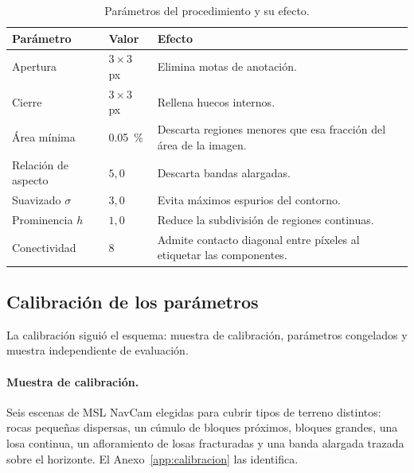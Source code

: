 \begin{table}[htbp]
  \centering
  \caption{Parámetros del procedimiento y su efecto.}
  \label{tab:parametros}
  \begin{tabular}{llp{6.3cm}}
    \toprule
    \textbf{Parámetro} & \textbf{Valor} & \textbf{Efecto} \\
    \midrule
    Apertura            & $3\times3$ px & Elimina motas de anotación. \\
    Cierre              & $3\times3$ px & Rellena huecos internos. \\
    Área mínima         & \SI{0.05}{\percent} & Descarta regiones menores que esa fracción del
      área de la imagen. \\
    Relación de aspecto & $5{,}0$  & Descarta bandas alargadas. \\
    Suavizado $\sigma$  & $3{,}0$  & Evita máximos espurios del contorno. \\
    Prominencia $h$     & $1{,}0$  & Reduce la subdivisión de regiones continuas. \\
    Conectividad        & $8$      & Admite contacto diagonal entre píxeles al etiquetar las
      componentes. \\
    \bottomrule
  \end{tabular}
\end{table}

\subsection{Calibración de los parámetros}
\label{sec:calibracion}

La calibración siguió el esquema: muestra de calibración, parámetros congelados y muestra
independiente de evaluación.

\paragraph{Muestra de calibración.} Seis escenas de MSL NavCam elegidas para cubrir tipos de
terreno distintos: rocas pequeñas dispersas, un cúmulo de bloques próximos, bloques grandes,
una losa continua, un afloramiento de losas fracturadas y una banda alargada trazada sobre el
horizonte. El Anexo~\ref{app:calibracion} las identifica.

